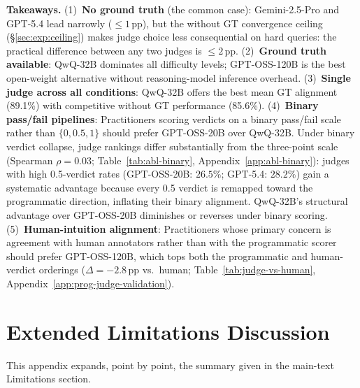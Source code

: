 \textbf{Takeaways.} (1)~\textbf{No ground truth} (the common case): Gemini-2.5-Pro and GPT-5.4 lead narrowly ($\leq 1$\,pp), but the without GT convergence ceiling (\S\ref{sec:exp:ceiling}) makes judge choice less consequential on hard queries: the practical difference between any two judges is $\leq 2$\,pp. (2)~\textbf{Ground truth available}: QwQ-32B dominates all difficulty levels; GPT-OSS-120B is the best open-weight alternative without reasoning-model inference overhead. (3)~\textbf{Single judge across all conditions}: QwQ-32B offers the best mean GT alignment (89.1\%) with competitive without GT performance (85.6\%). (4)~\textbf{Binary pass/fail pipelines}: Practitioners scoring verdicts on a binary pass/fail scale rather than $\{0, 0.5, 1\}$ should prefer GPT-OSS-20B over QwQ-32B. Under binary verdict collapse, judge rankings differ substantially from the three-point scale (Spearman $\rho = 0.03$; Table~\ref{tab:abl-binary}, Appendix~\ref{app:abl-binary}): judges with high 0.5-verdict rates (GPT-OSS-20B: $26.5\%$; GPT-5.4: $28.2\%$) gain a systematic advantage because every 0.5 verdict is remapped toward the programmatic direction, inflating their binary alignment. QwQ-32B's structural advantage over GPT-OSS-20B diminishes or reverses under binary scoring. (5)~\textbf{Human-intuition alignment}: Practitioners whose primary concern is agreement with human annotators rather than with the programmatic scorer should prefer GPT-OSS-120B, which tops both the programmatic and human-verdict orderings ($\Delta = -2.8$\,pp vs.\ human; Table~\ref{tab:judge-vs-human}, Appendix~\ref{app:prog-judge-validation}).

\section{Extended Limitations Discussion}
\label{app:limitations-extended}

This appendix expands, point by point, the summary given in the main-text Limitations section.

